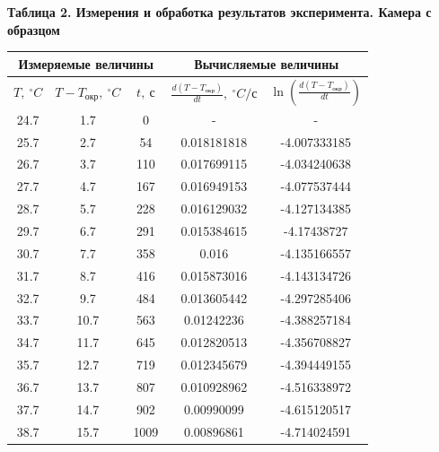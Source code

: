 \documentclass[12pt]{article}
\begin{document}
\begin{flushleft}
    \begin{center}
        \textbf{Таблица 2. Измерения и обработка результатов эксперимента. Камера с образцом} \\
    \end{center}
    \begin{table}[h!]
        \centering
        \begin{tabular}{|c|c|c|c|c|}
            \hline
            \multicolumn{3}{|c|}{Измеряемые величины} & \multicolumn{2}{c|}{Вычисляемые величины} \\
            \hline
            $T,\ ^\circ C$ & $T - T_{\text{окр}},\ ^\circ C$ & $t,\ \text{с}$ & $\frac{d(T - T_{\text{окр}})}{dt},\ ^\circ C/\text{с}$ & $\ln\left(\frac{d(T - T_{\text{окр}})}{dt}\right)$ \\
            \hline
            24.7	&	1.7	&	0	&	-	&	-	\\
            \hline
            25.7	&	2.7	&	54	&	0.018181818	&	-4.007333185	\\
            \hline
            26.7	&	3.7	&	110	&	0.017699115	&	-4.034240638	\\
            \hline
            27.7	&	4.7	&	167	&	0.016949153	&	-4.077537444	\\
            \hline
            28.7	&	5.7	&	228	&	0.016129032	&	-4.127134385	\\
            \hline
            29.7	&	6.7	&	291	&	0.015384615	&	-4.17438727	\\
            \hline
            30.7	&	7.7	&	358	&	0.016	&	-4.135166557	\\
            \hline
            31.7	&	8.7	&	416	&	0.015873016	&	-4.143134726	\\
            \hline
            32.7	&	9.7	&	484	&	0.013605442	&	-4.297285406	\\
            \hline
            33.7	&	10.7	&	563	&	0.01242236	&	-4.388257184	\\
            \hline
            34.7	&	11.7	&	645	&	0.012820513	&	-4.356708827	\\
            \hline
            35.7	&	12.7	&	719	&	0.012345679	&	-4.394449155	\\
            \hline
            36.7	&	13.7	&	807	&	0.010928962	&	-4.516338972	\\
            \hline
            37.7	&	14.7	&	902	&	0.00990099	&	-4.615120517	\\
            \hline
            38.7	&	15.7	&	1009	&	0.00896861	&	-4.714024591	\\
            \hline

\end{tabular}
\end{table}
\end{flushleft}
\end{document}
